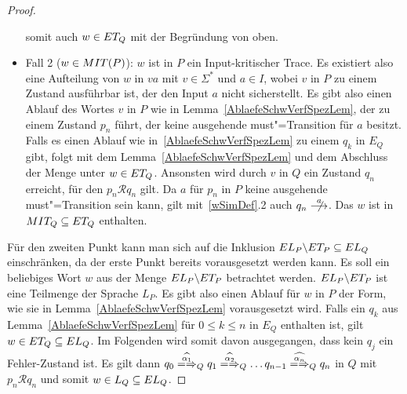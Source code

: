 \begin{proof}
\begin{itemize}
      somit auch $w\in ET _Q$ mit der Begründung von oben.
    \item Fall 2 ($w\in MIT (P)$): $w$ ist in $P$ ein Input-kritischer Trace.
      Es existiert also eine Aufteilung von $w$ in $va$ mit $v\in \Sigma ^*$
      und $a\in I$, wobei $v$ in $P$ zu einem Zustand ausführbar ist, der den
      Input $a$ nicht sicherstellt. Es gibt also einen Ablauf des Wortes $v$ in
      $P$ wie in Lemma~\ref{AblaefeSchwVerfSpezLem}, der zu einem Zustand $p_n$
      führt, der keine ausgehende must"=Transition für $a$ besitzt. Falls es
      einen Ablauf wie in~\ref{AblaefeSchwVerfSpezLem} zu einem $q_k$ in $E_Q$
      gibt, folgt mit dem Lemma~\ref{AblaefeSchwVerfSpezLem} und dem Abschluss
      der Menge \ET{} unter \cont{} $w\in ET _Q$. Ansonsten wird durch $v$ in
      $Q$ ein Zustand $q_n$ erreicht, für den $p_n\mathcal{R} q_n$ gilt. Da $a$
      für $p_n$ in $P$ keine ausgehende must"=Transition sein kann, gilt
      mit~\ref{wSimDef}.2 auch $q_n \nmust[a]$. Das $w$ ist in $MIT _Q
      \subseteq ET _Q$ enthalten.
  \end{itemize}
  Für den zweiten Punkt kann man sich auf die Inklusion $EL _P\backslash ET _P
  \subseteq EL _Q$ einschränken, da der erste Punkt bereits vorausgesetzt
  werden kann. Es soll ein beliebiges Wort $w$ aus der Menge $EL
  _P\backslash ET _P$ betrachtet werden. $EL _P\backslash ET _P$ ist eine
  Teilmenge der Sprache $L _P$. Es gibt also einen Ablauf für $w$ in $P$ der
  Form, wie sie in Lemma~\ref{AblaefeSchwVerfSpezLem} vorausgesetzt wird. Falls
  ein $q_k$ aus Lemma~\ref{AblaefeSchwVerfSpezLem} für $0 \leq k \leq n$ in
  $E_Q$ enthalten ist, gilt $w\in ET _Q \subseteq EL _Q$. Im Folgenden wird
  somit davon ausgegangen, dass kein $q_j$ ein Fehler-Zustand ist. Es gilt dann
  $q_0 \weakmay[\widehat{\alpha _1}]_Q q_1 \weakmay[\widehat{\alpha _2}]_Q
  \dots q_{n-1} \weakmay[\widehat{\alpha _n}]_Q q_n$ in $Q$ mit $p_n
  \mathcal{R} q_n$ und somit $w\in L _Q\subseteq EL _Q$.


\end{proof}

